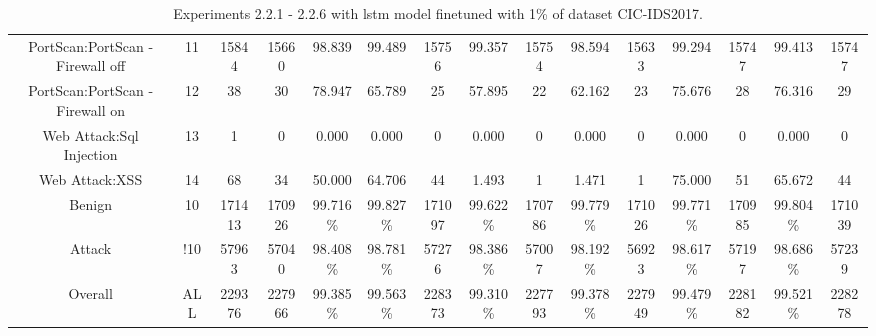 \begin{table}[htb]
\begin{tabular}{@{}ccccccccccccccc@{}}
        PortScan:PortScan - Firewall off &  11 &  15844 &  15660 &  98.839 &  99.489 &  15756 &  99.357 &  15754 &  98.594 &  15633 &  99.294 &  15747 &  99.413 &  15747 \\
        PortScan:PortScan - Firewall on &  12 &  38 &  30 &  78.947 &  65.789 &  25 &  57.895 &  22 &  62.162 &  23 &  75.676 &  28 &  76.316 &  29 \\
        Web Attack:Sql Injection &  13 &  1 &  0 &  0.000 &  0.000 &  0 &  0.000 &  0 &  0.000 &  0 &  0.000 &  0 &  0.000 &  0 \\
        Web Attack:XSS &  14 &  68 &  34 &  50.000 &  64.706 &  44 &  1.493 &  1 &  1.471 &  1 &  75.000 &  51 &  65.672 &  44 \\
        Benign &  10 &  171413 &  170926 &  99.716\% &  99.827\% &  171097 &  99.622\% &  170786 &  99.779\% &  171026 &  99.771\% &  170985 &  99.804\% &  171039 \\
        Attack &  !10 &  57963 &  57040 &  98.408\% &  98.781\% &  57276 &  98.386\% &  57007 &  98.192\% &  56923 &  98.617\% &  57197 &  98.686\% &  57239 \\
        Overall &  ALL &  229376 &  227966 &  99.385\% &  99.563\% &  228373 &  99.310\% &  227793 &  99.378\% &  227949 &  99.479\% &  228182 &  99.521\% &  228278 \\
        \bottomrule
    \end{tabular}
    \caption{Experiments 2.2.1 - 2.2.6 with \gls{lstm} model finetuned with 1\% of dataset CIC-IDS2017.}
    \label{table:results:lstm:flows_1}
\end{table}